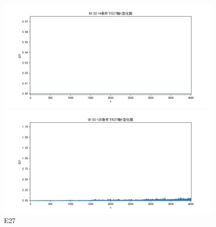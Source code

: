 \documentclass[10pt, a4paper]{article}
\begin{document}
    \begin{figure}[H]
        \begin{minipage}[t]{0.49\textwidth}
            \centering
            \includegraphics[width=\textwidth]{./q5_pics/cmp/E27.png}
        \end{minipage}
        \begin{minipage}[t]{0.49\textwidth}
            \centering
            \includegraphics[width=\textwidth]{./q5_pics/exp/E27.png}
        \end{minipage}
        \caption{E27}\label{fig:E27 in q5}
    \end{figure}
\end{document}
